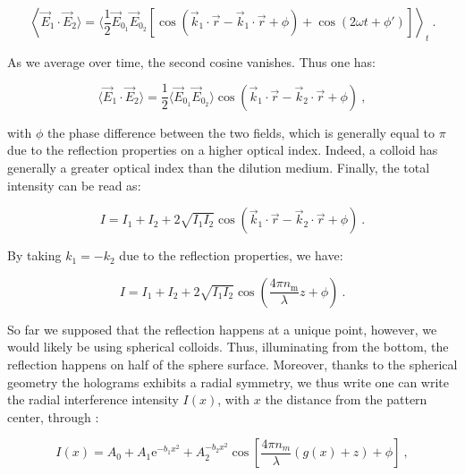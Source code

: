 \begin{equation}
	\left\langle  
	\vec{E}_1 \cdot \vec{E}_2 \rangle = 
	\langle
	\frac{1}{2} \vec{E}_{0_1}  \vec{E}_{0_2} 
	\left[
		\cos 
		\left(
			\vec{k}_1 \cdot \vec{r} - \vec{k}_1 \cdot \vec{r} + \phi	
		\right)	
		+ 
		\cos
		\left(
			2\omega t + \phi'
		\right)
	\right]
	\right\rangle_t~.
\end{equation}

As we average over time, the second cosine vanishes. Thus one has:

\begin{equation}
	\langle \vec{E}_1 \cdot \vec{E}_2 \rangle = \frac{1}{2} \langle  \vec{E}_{0_1}  \vec{E}_{0_2} \rangle
	\cos 
	\left(
	\vec{k}_1 \cdot \vec{r} - \vec{k}_2 \cdot \vec{r} + \phi	
	\right)	 ~,
\end{equation}

with $\phi$ the phase difference between the two fields, which is generally equal to $\pi$ due to the reflection properties on a higher optical index. Indeed, a colloid has generally a greater optical index than the dilution medium.  Finally, the total intensity can be read as:


\begin{equation}
	I = I_1 + I_2 + 2 \sqrt{I_1 I_2} 
	\cos 
	\left(
	\vec{k}_1 \cdot \vec{r} - \vec{k}_2 \cdot \vec{r} + \phi	
	\right) ~.
\end{equation}

By taking $k_1 = - k_2$ due to the reflection properties, we have:


\begin{equation}
	I = I_1 + I_2 + 2 \sqrt{I_1 I_2} 
	\cos 
	\left(
	\frac{4 \pi n_{\mathrm{m}}}{\lambda} z + \phi	
	\right) ~.
\end{equation}


So far we supposed that the reflection happens at a unique point, however, we would likely be using spherical colloids. Thus, illuminating from the bottom, the reflection happens on half of the sphere surface. Moreover, thanks to the spherical geometry the holograms exhibits a radial symmetry, we thus write one can write the radial interference intensity $I(x)$, with $x$ the distance from the pattern center, through \cite{ raedler_measurement_1992}:


\begin{equation}
	I(x) = A_0 + A_1 \mathrm{e}^{-b_1 x^2} + A_2^{-b_2 x^2} \cos \left[ \frac{4\pi n_m}{\lambda}\left( g(x) + z \right) + \phi \right] ~,
	\label{Eq.RICM}
\end{equation}

